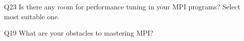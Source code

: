 \begin{description}%
\item{Q23} Is there any room for performance tuning in your MPI programs? Select most suitable one.%
\item{Q19} What are your obstacles to mastering MPI?%
\end{description}%
